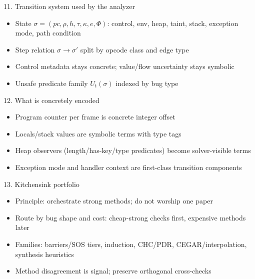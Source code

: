 \documentclass[aspectratio=169]{beamer}
\begin{document}
\begin{frame}{11. Transition system used by the analyzer}
\begin{itemize}
  \item State \(\sigma=(pc,\rho,h,\tau,\kappa,e,\Phi)\): control, env, heap, taint, stack, exception mode, path condition
  \item Step relation \(\sigma\xrightarrow{}\sigma'\) split by opcode class and edge type
  \item Control metadata stays concrete; value/flow uncertainty stays symbolic
  \item Unsafe predicate family \(U_t(\sigma)\) indexed by bug type
\end{itemize}
\end{frame}

\begin{frame}{12. What is concretely encoded}
\begin{itemize}
  \item Program counter per frame is concrete integer offset
  \item Locals/stack values are symbolic terms with type tags
  \item Heap observers (length/has-key/type predicates) become solver-visible terms
  \item Exception mode and handler context are first-class transition components
\end{itemize}
\end{frame}

\begin{frame}{13. Kitchensink portfolio}
\begin{itemize}
  \item Principle: orchestrate strong methods; do not worship one paper
  \item Route by bug shape and cost: cheap-strong checks first, expensive methods later
  \item Families: barriers/SOS tiers, induction, CHC/PDR, CEGAR/interpolation, synthesis heuristics
  \item Method disagreement is signal; preserve orthogonal cross-checks
\end{itemize}
\end{frame}
\end{document}
